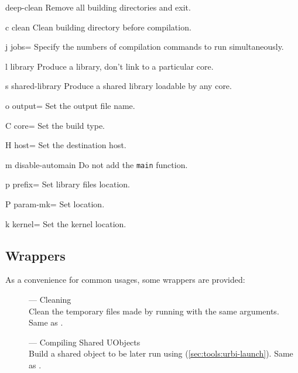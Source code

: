 \begin{options}
\item{deep-clean} Remove all building directories and exit.
\item[c]{clean} Clean building directory before compilation.
\item[j]{jobs=} Specify the numbers of compilation
  commands to run simultaneously.
\item[l]{library} Produce a library, don't link to a particular
  core.
\item[s]{shared-library} Produce a shared library loadable by any
  core.
\item[o]{output=} Set the output file name.
\item[C]{core=} Set the build type.
\item[H]{host=} Set the destination host.
\item[m]{disable-automain} Do not add the \lstinline|main| function.
\end{options}

\begin{options}
\item[p]{prefix=} Set library files location.
\item[P]{param-mk=} Set  location.
\item[k]{kernel=} Set the kernel location.
\end{options}


\subsection{ Wrappers}
\label{sec:tools:umake:wrappers}

As a convenience for common  usages, some wrappers are
provided:
\begin{description}
\item[] --- Cleaning\\
  Clean the temporary files made by running  with the
  same arguments.  Same as .
\item[] --- Compiling Shared UObjects\\
  Build a shared object to be later run using 
  (\autoref{sec:tools:urbi-launch}).  Same as .
\end{description}


